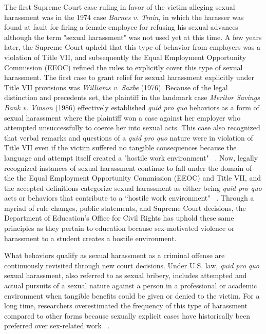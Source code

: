 The first Supreme Court case ruling in favor of the victim alleging sexual harassment was in the 1974 case \textit{Barnes v. Train}, in which the harasser was found at fault for firing a female employee for refusing his sexual advances although the term "sexual harassment" was not used yet at this time. A few years later, the Supreme Court upheld that this type of behavior from employers was a violation of Title VII, and subsequently the Equal Employment Opportunity Commission (EEOC) refined the rules to explicitly cover this type of sexual harassment. The first case to grant relief for sexual harassment explicitly under Title VII provisions was \textit{Williams v. Saxbe} (1976). Because of the legal distinction and precedents set, the plaintiff in the landmark case \textit{Meritor Savings Bank v. Vinson} (1986) effectively established \textit{quid pro quo} behaviors as a form of sexual harassment where the plaintiff won a case against her employer who attempted unsuccessfully to coerce her into sexual acts. This case also recognized that verbal remarks and questions of a \textit{quid pro quo} nature were in violation of Title VII even if the victim suffered no tangible consequences because the language and attempt itself created a "hostile work environment" ~\cite{bostonLawReview}. Now, legally recognized instances of sexual harassment continue to fall under the domain of the the Equal Employment Opportunity Commission (EEOC) and Title VII, and the accepted definitions categorize sexual harassment as either being \textit{quid pro quo} acts or behaviors that contribute to a ``hostile work environment" ~\cite{legalHistory1988}. Through a myriad of rule changes, public statements, and Supreme Court decisions, the Department of Education's Office for Civil Rights has uphold these same principles as they pertain to education because sex-motivated violence or harassment to a student creates a hostile environment.

What behaviors qualify as sexual harassment as a criminal offense are continuously revisited through new court decisions. Under U.S. law, \textit{quid pro quo} sexual harassment, also referred to as sexual bribery, includes attempted and actual pursuits of a sexual nature against a person in a professional or academic environment when tangible benefits could be given or denied to the victim. For a long time, researchers overestimated the frequency of this type of harassment compared to other forms  because sexually explicit cases have historically been preferred over sex-related work ~\cite{fitzgerald1995measuring}.

